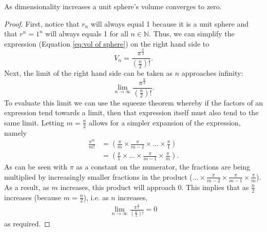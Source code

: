 \begin{lemma}\label{lemma:unit sphere volume tends to zero}
    As dimensionality increases a unit sphere's volume converges to zero.
\end{lemma}
\begin{proof}
    First, notice that $r_n$ will always equal 1 because it is a unit sphere and that $r^n=1^n$ will always equals 1 for all $n \in \mathbb{N}$. Thus, we can simplify the expression (Equation \ref{eq:vol of sphere}) on the right hand side to
    \begin{equation*}
        V_n=\frac{\pi^{\frac{n}{2}}}{\left(\frac{n}{2}\right)!}.
    \end{equation*}
    Next, the limit of the right hand side can be taken as $n$ approaches infinity:
    \begin{equation*}
        \lim_{n\to\infty}\frac{\pi^{\frac{n}{2}}}{\left(\frac{n}{2}\right)!}.
    \end{equation*}
    To evaluate this limit we can use the squeeze theorem whereby if the factors of an expression tend towards a limit, then that expression itself must also tend to the same limit. Letting $m=\frac{n}{2}$ allows for a simpler expansion of the expression, namely %
    \begin{align*}
        \frac{\pi ^ m}{m!} &= \left( \frac{\pi}{m} \times \frac{\pi}{m-1} \times ... \times \frac{\pi}{1}\right)\\
        &= \left( \frac{\pi}{1} \times ... \times \frac{\pi}{m-1} \times \frac{\pi}{m} \right).
    \end{align*}
    As can be seen with $\pi$ as a constant on the numerator, the fractions are being multiplied by increasingly smaller fractions in the product ($... \times \frac{\pi}{m-2} \times \frac{\pi}{m-1} \times \frac{\pi}{m}$). As a result, as $m$ increases, this product will approach 0. This implies that as $\frac{n}{2}$ increases (because $m=\frac{n}{2}$), i.e. as $n$ increases,
    \begin{align*}
         \lim_{n\to\infty}\frac{\pi^{\frac{n}{2}}}{\left(\frac{n}{2}\right)!}=0
    \end{align*}
    as required.
\end{proof}

